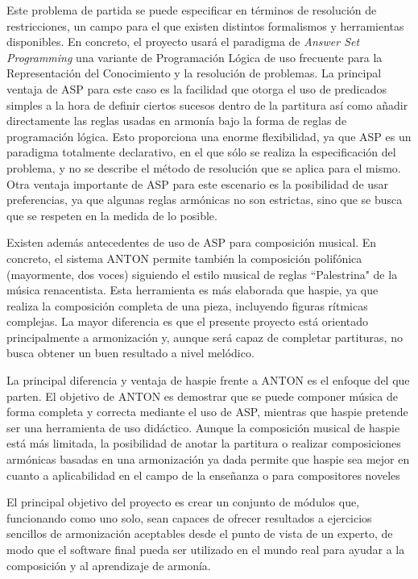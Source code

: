  Este problema de partida se puede especificar en términos de resolución de restricciones, un campo para el que existen distintos formalismos y herramientas disponibles. En concreto, el proyecto usará el paradigma de \textit{Answer Set Programming} una variante de Programación Lógica de uso frecuente para la Representación del Conocimiento y la resolución de problemas. La principal ventaja de ASP para este caso es la facilidad que otorga el uso de predicados simples a la hora de definir ciertos sucesos dentro de la partitura así como añadir directamente las reglas usadas en armonía bajo la forma de reglas de programación lógica. Esto proporciona una enorme flexibilidad, ya que ASP es un paradigma totalmente declarativo, en el que sólo se realiza la especificación del problema, y no se describe el método de resolución que se aplica para el mismo. Otra ventaja importante de ASP para este escenario es la posibilidad de usar preferencias, ya que algunas reglas armónicas no son estrictas, sino que se busca que se respeten en la medida de lo posible. 
 
 Existen además antecedentes de uso de ASP para composición musical. En concreto, el sistema ANTON\cite{anton-composing} permite también la composición polifónica (mayormente, dos voces) siguiendo el estilo musical de reglas ``Palestrina"\cite{palestrina-rules} de la música renacentista. Esta herramienta es más elaborada que haspie, ya que realiza la composición completa de una pieza, incluyendo figuras rítmicas complejas. La mayor diferencia es que el presente proyecto está orientado principalmente a armonización y, aunque será capaz de completar partituras, no busca obtener un buen resultado a nivel melódico.
 
 La principal diferencia y ventaja de haspie frente a ANTON es el enfoque del que parten. El objetivo de ANTON es demostrar que se puede componer música de forma completa y correcta mediante el uso de ASP, mientras que haspie pretende ser una herramienta de uso didáctico.
 Aunque la composición musical de haspie está más limitada, la posibilidad de anotar la partitura o realizar composiciones armónicas basadas en una armonización ya dada permite que haspie sea mejor en cuanto a aplicabilidad en el campo de la enseñanza o para compositores noveles
 
 El principal objetivo del proyecto es crear un conjunto de módulos que, funcionando como uno solo, sean capaces de ofrecer resultados a ejercicios sencillos de armonización aceptables desde el punto de vista de un experto, de modo que el software final pueda ser utilizado en el mundo real para ayudar a la composición y al aprendizaje de armonía.
 
